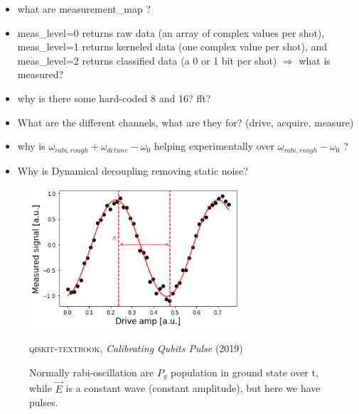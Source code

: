 \begin{itemize}
    \item what are measurement\_map ?
    \item meas\_level=0 returns raw data (an array of complex values per shot), meas\_level=1 returns kerneled data (one complex value per shot), and meas\_level=2 returns classified data (a 0 or 1 bit per shot) $\Rightarrow$ what is measured?
    \item why is there some hard-coded 8 and 16? fft?
    \item What are the different channels, what are they for? (drive, acquire, measure)
    \item why is $\omega_{rabi,rough} + \omega_{detune}- \omega_{0}$ helping experimentally over $\omega_{rabi,rough} - \omega_{0}$ ?
    \item Why is Dynamical decoupling removing static noise?
\end{itemize}


\begin{figure}[H]
    \centering
    \includegraphics[width=0.7\textwidth]{IMAGE/rabi_osc.png}\\
    \caption{Normally rabi-oscillation are $P_g$ population in ground state over t, while $\vec{E}$ is a constant wave (constant amplitude), but here we have pulses.}
    \textsc{qiskit-textbook}, \emph{Calibrating Qubits Pulse} (2019)
    \label{fig:rabi}
\end{figure}


